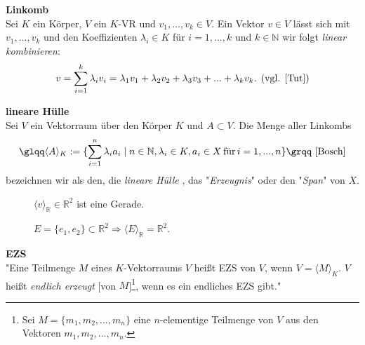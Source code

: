 \theoremstyle{definition}
\begin{definition}{\textbf{\acl{Linkomb}}}
\\Sei $K$ ein Körper, $V$ ein $K$-\acl{VR} und ${v_1,...,v_k \in V}$. Ein Vektor $v \in V$ lässt sich mit $v_1,...,v_k$ und den Koeffizienten $\lambda_i \in K$ für $i=1,...,k$ und $k \in \mathbb{N}$ wir folgt \emph{linear kombinieren}:
\[v = \sum_{i=1}^k \lambda_i v_i = \lambda_1 v_1 + \lambda_2 v_2 + \lambda_3 v_3 + ... + \lambda_k v_k \text{. (vgl. \cite[S. 298, 16.3]{Tut})}\]
\end{definition}

\theoremstyle{definition}
\begin{definition}{\textbf{lineare Hülle}}
	\\ Sei $V$ ein Vektorraum über den Körper $K$ und $A \subset V$. Die Menge aller \aclp{Linkomb} 
\[\text{\glqq}\langle A \rangle_K := \{\sum \limits_{i=1}^{n} \lambda_i a_i \mid n \in \mathbb{N}, \lambda_i \in K, a_i \in X \,\text{für} \, i = 1,...,n \}\text{\grqq \cite[S. 30]{Bosch}}\]
bezeichnen wir als den,  die {\glqq}\emph{lineare Hülle}{\grqq} \cite[S. 298, 16.4]{Tut}, das "\emph{Erzeugnis}" \cite[S. 298, 16.4]{Tut} oder den "\emph{Span}" \cite[S. 298, 16.4]{Tut} von $X$. 
\label{linhuelledef}
\end{definition}

\begin{figure} [!tbp]
 	\centering
	\begin{minipage}[b]{0.4\textwidth}
		\def\svgwidth{175pt}
		
		\caption{$\langle v \rangle_\mathbb{R} \in \mathbb{R}^2$ ist eine Gerade.} 
		\label{fig:UVR}
	\end{minipage}
\hfill
	\begin{minipage}[b]{0.4\textwidth}
		\def\svgwidth{175pt}
		
		\caption{\(E = \{e_1,e_2\} \subset \mathbb{R}^2 \Rightarrow \langle E \rangle_{\mathbb{R}} = \mathbb{R}^2\).}
	\end{minipage}
\end{figure} 
 
\theoremstyle{definition}
\begin{definition}{\textbf{\acl{EZS}}}
	\\"Eine Teilmenge $M$ eines $K$-Vektorraums $V$ heißt \acl{EZS} von $V$, wenn $V = \langle M \rangle_K$. $V$ heißt \emph{endlich erzeugt} [von $M$]\footnote{\label{foot:1}Sei $M = \{m_1, m_2, ..., m_n\}$ eine $n$-elementige Teilmenge von $V$ aus den Vektoren $m_1, m_2, ..., m_n$.}, wenn es ein endliches \acl{EZS} gibt." \cite[S. 39, 9.4]{Skript}
\end{definition}

